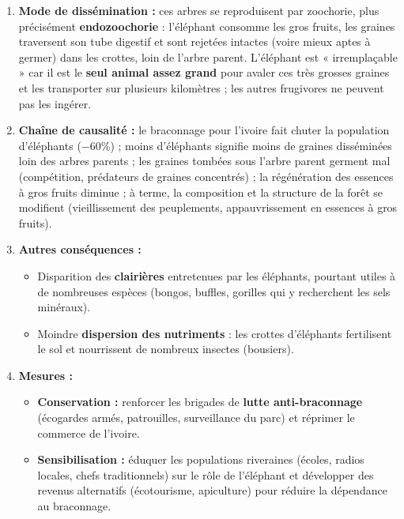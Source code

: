 \documentclass[11pt]{article}
\newcommand{\cle}[1]{{\popxbold\color{popdark}#1}}
\begin{document}
\begin{corrige}
\begin{enumerate}
    \item \textbf{Mode de dissémination :} ces arbres se reproduisent par \cle{zoochorie}, plus précisément \textbf{endozoochorie} : l'éléphant consomme les gros fruits, les graines traversent son tube digestif et sont rejetées intactes (voire mieux aptes à germer) dans les crottes, loin de l'arbre parent. L'éléphant est « irremplaçable » car il est le \textbf{seul animal assez grand} pour avaler ces très grosses graines et les transporter sur plusieurs kilomètres ; les autres frugivores ne peuvent pas les ingérer.
    \item \textbf{Chaîne de causalité :} le braconnage pour l'ivoire fait chuter la population d'éléphants (\num{-60}\%) ; moins d'éléphants signifie moins de graines disséminées loin des arbres parents ; les graines tombées sous l'arbre parent germent mal (compétition, prédateurs de graines concentrés) ; la régénération des essences à gros fruits diminue ; à terme, la composition et la structure de la forêt se modifient (vieillissement des peuplements, appauvrissement en essences à gros fruits).
    \item \textbf{Autres conséquences :}
    \begin{itemize}
        \item Disparition des \textbf{clairières} entretenues par les éléphants, pourtant utiles à de nombreuses espèces (bongos, buffles, gorilles qui y recherchent les sels minéraux).
        \item Moindre \textbf{dispersion des nutriments} : les crottes d'éléphants fertilisent le sol et nourrissent de nombreux insectes (bousiers).
    \end{itemize}
    \item \textbf{Mesures :}
    \begin{itemize}
        \item \textbf{Conservation :} renforcer les brigades de \textbf{lutte anti-braconnage} (écogardes armés, patrouilles, surveillance du parc) et réprimer le commerce de l'ivoire.
        \item \textbf{Sensibilisation :} éduquer les populations riveraines (écoles, radios locales, chefs traditionnels) sur le rôle de l'éléphant et développer des revenus alternatifs (écotourisme, apiculture) pour réduire la dépendance au braconnage.
    \end{itemize}
\end{enumerate}
\end{corrige}
\end{document}
